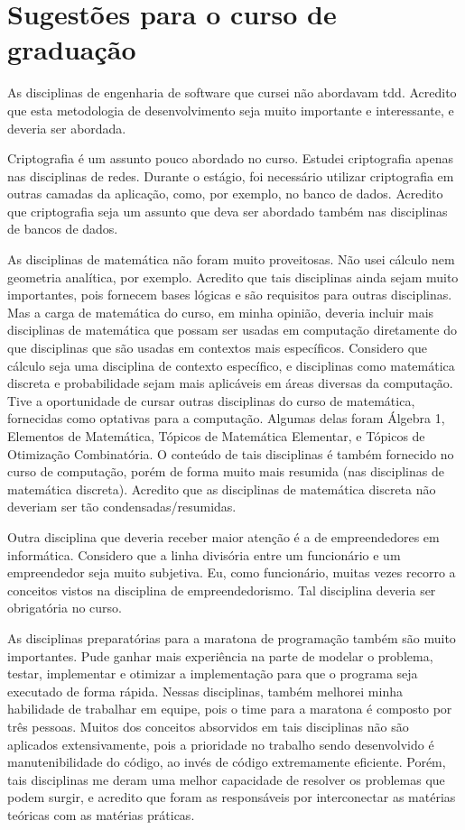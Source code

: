 \section{Sugestões para o curso de graduação}

As disciplinas de engenharia de software que cursei não abordavam \gls{tdd}. Acredito que esta metodologia de desenvolvimento seja
muito importante e interessante, e deveria ser abordada.

Criptografia é um assunto pouco abordado no curso. Estudei criptografia apenas nas disciplinas de redes. Durante o estágio, foi necessário
utilizar criptografia em outras camadas da aplicação, como, por exemplo, no banco de dados. Acredito que criptografia seja um assunto
que deva ser abordado também nas disciplinas de bancos de dados.

As disciplinas de matemática não foram muito proveitosas. Não usei cálculo nem geometria analítica, por exemplo. 
Acredito que tais disciplinas ainda sejam muito importantes, pois fornecem bases lógicas e são requisitos para outras disciplinas. 
Mas a carga de matemática do curso, em minha opinião, deveria incluir mais disciplinas de matemática que possam ser usadas em computação 
diretamente do que disciplinas que são usadas em contextos mais específicos. Considero que cálculo seja uma disciplina de contexto 
específico, e disciplinas como matemática discreta e probabilidade sejam mais aplicáveis em áreas diversas da computação. Tive a 
oportunidade de cursar outras disciplinas do curso de matemática, fornecidas como optativas para a computação. Algumas delas 
foram Álgebra 1, Elementos de Matemática, Tópicos de Matemática Elementar, e Tópicos de Otimização Combinatória. O conteúdo de 
tais disciplinas é também fornecido no curso de computação, porém de forma muito mais resumida (nas disciplinas de matemática discreta). 
Acredito que as disciplinas de matemática discreta não deveriam ser tão condensadas/resumidas.

Outra disciplina que deveria receber maior atenção é a de empreendedores em informática. Considero que a linha divisória entre um 
funcionário e um empreendedor seja muito subjetiva. Eu, como funcionário, muitas vezes recorro a conceitos vistos na disciplina de 
empreendedorismo. Tal disciplina deveria ser obrigatória no curso.

As disciplinas preparatórias para a maratona de programação também são muito importantes. Pude ganhar mais experiência 
na parte de modelar o problema, testar, implementar e otimizar a implementação para que o programa seja executado de forma rápida. 
Nessas disciplinas, também melhorei minha habilidade de trabalhar em equipe, pois o time para a maratona é composto por três pessoas. 
Muitos dos conceitos absorvidos em tais disciplinas não são aplicados extensivamente, pois a prioridade no trabalho sendo desenvolvido é 
manutenibilidade do código, ao invés de código extremamente eficiente. Porém, tais disciplinas me deram uma melhor capacidade de 
resolver os problemas que podem surgir, e acredito que foram as responsáveis por interconectar as matérias teóricas com as matérias práticas.

